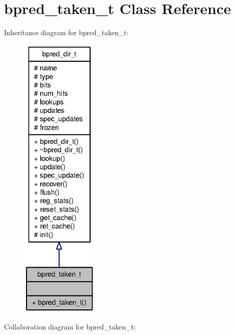 \section{bpred\_\-taken\_\-t Class Reference}
\label{classbpred__taken__t}
Inheritance diagram for bpred\_\-taken\_\-t:\nopagebreak
\begin{figure}[H]
\begin{center}
\leavevmode
\includegraphics[height=400pt]{classbpred__taken__t__inherit__graph}
\end{center}
\end{figure}
Collaboration diagram for bpred\_\-taken\_\-t:\nopagebreak
